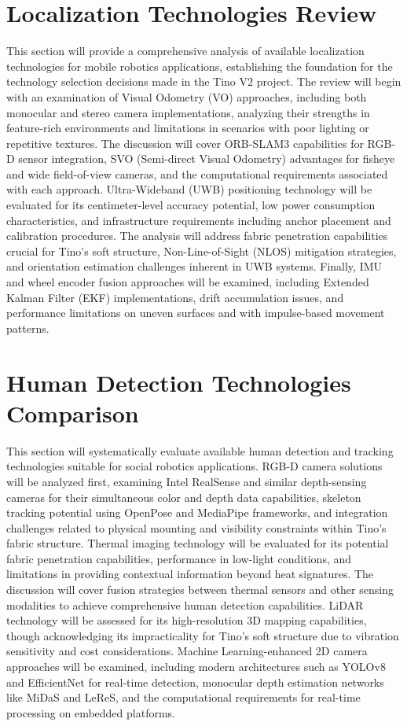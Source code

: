 \section{Localization Technologies Review}
This section will provide a comprehensive analysis of available localization technologies for mobile robotics applications, establishing the foundation for the technology selection decisions made in the Tino V2 project. The review will begin with an examination of Visual Odometry (VO) approaches, including both monocular and stereo camera implementations, analyzing their strengths in feature-rich environments and limitations in scenarios with poor lighting or repetitive textures. The discussion will cover ORB-SLAM3 capabilities for RGB-D sensor integration, SVO (Semi-direct Visual Odometry) advantages for fisheye and wide field-of-view cameras, and the computational requirements associated with each approach. Ultra-Wideband (UWB) positioning technology will be evaluated for its centimeter-level accuracy potential, low power consumption characteristics, and infrastructure requirements including anchor placement and calibration procedures. The analysis will address fabric penetration capabilities crucial for Tino's soft structure, Non-Line-of-Sight (NLOS) mitigation strategies, and orientation estimation challenges inherent in UWB systems. Finally, IMU and wheel encoder fusion approaches will be examined, including Extended Kalman Filter (EKF) implementations, drift accumulation issues, and performance limitations on uneven surfaces and with impulse-based movement patterns.

\section{Human Detection Technologies Comparison}
This section will systematically evaluate available human detection and tracking technologies suitable for social robotics applications. RGB-D camera solutions will be analyzed first, examining Intel RealSense and similar depth-sensing cameras for their simultaneous color and depth data capabilities, skeleton tracking potential using OpenPose and MediaPipe frameworks, and integration challenges related to physical mounting and visibility constraints within Tino's fabric structure. Thermal imaging technology will be evaluated for its potential fabric penetration capabilities, performance in low-light conditions, and limitations in providing contextual information beyond heat signatures. The discussion will cover fusion strategies between thermal sensors and other sensing modalities to achieve comprehensive human detection capabilities. LiDAR technology will be assessed for its high-resolution 3D mapping capabilities, though acknowledging its impracticality for Tino's soft structure due to vibration sensitivity and cost considerations. Machine Learning-enhanced 2D camera approaches will be examined, including modern architectures such as YOLOv8 and EfficientNet for real-time detection, monocular depth estimation networks like MiDaS and LeReS, and the computational requirements for real-time processing on embedded platforms.

